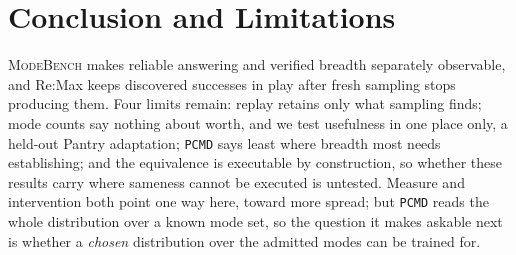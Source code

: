 \documentclass{article}
\newcommand{\1}{\mathbf 1}
\newcommand{\mb}{\textsc{ModeBench}}
\newcommand{\pmd}{\texttt{PCMD}}
\theoremstyle{remark}
\theoremstyle{definition}
\theoremstyle{plain}
\begin{document}
\section{Conclusion and Limitations}
\label{sec:conclusion}
\label{sec:discussion}
\label{sec:limitations}

\mb{} makes reliable answering and verified breadth separately observable, and
Re:Max keeps discovered successes in play after fresh sampling stops
producing them. Four limits remain: replay retains only what sampling finds;
mode counts say nothing about worth, and we test usefulness in one place only,
a held-out Pantry adaptation; \pmd{} says least where breadth most needs
establishing; and the equivalence is executable by construction, so whether
these results carry where sameness cannot be executed is untested. Measure and intervention both point one way here,
toward more spread; but \pmd{} reads the whole distribution over a known mode
set, so the question it makes askable next is whether a \emph{chosen}
distribution over the admitted modes can be trained for.

\label{sec:main-end}

\clearpage
{}\label{sec:references}



\long{}
\end{document}
